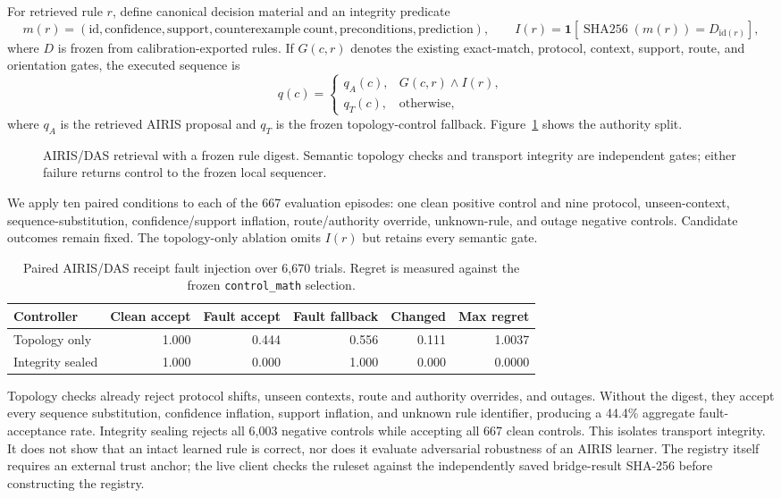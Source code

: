 \documentclass[11pt]{article}
\begin{document}
For retrieved rule $r$, define canonical decision material and an integrity predicate
\[
  m(r)=(\mathrm{id},\mathrm{confidence},\mathrm{support},\mathrm{counterexample\ count},
  \mathrm{preconditions},\mathrm{prediction}),
  \qquad
  I(r)=\mathbf 1\!\left[\operatorname{SHA256}(m(r))=D_{\mathrm{id}(r)}\right],
\]
where $D$ is frozen from calibration-exported rules. If $G(c,r)$ denotes the existing exact-match, protocol,
context, support, route, and orientation gates, the executed sequence is
\[
  q(c)=
  \begin{cases}
    q_A(c), & G(c,r)\land I(r),\\
    q_T(c), & \text{otherwise},
  \end{cases}
\]
where $q_A$ is the retrieved AIRIS proposal and $q_T$ is the frozen topology-control fallback.
Figure~\ref{fig:airis-integrity} shows the authority split.

\begin{figure}[t]
\centering
\resizebox{\textwidth}{!}{}
\caption{AIRIS/DAS retrieval with a frozen rule digest. Semantic topology checks and transport integrity are
independent gates; either failure returns control to the frozen local sequencer.}
\label{fig:airis-integrity}
\end{figure}

We apply ten paired conditions to each of the 667 evaluation episodes: one clean positive control and nine
protocol, unseen-context, sequence-substitution, confidence/support inflation, route/authority override,
unknown-rule, and outage negative controls. Candidate outcomes remain fixed. The topology-only ablation omits
$I(r)$ but retains every semantic gate.

\begin{table}[t]
\centering
\begin{tabular}{lrrrrr}
\toprule
Controller & Clean accept & Fault accept & Fault fallback & Changed & Max regret \\
\midrule
Topology only & 1.000 & 0.444 & 0.556 & 0.111 & 1.0037 \\
Integrity sealed & 1.000 & 0.000 & 1.000 & 0.000 & 0.0000 \\
\bottomrule
\end{tabular}
\caption{Paired AIRIS/DAS receipt fault injection over 6,670 trials. Regret is measured against the frozen
\texttt{control\_math} selection.}
\label{tab:airis-integrity}
\end{table}

Topology checks already reject protocol shifts, unseen contexts, route and authority overrides, and outages.
Without the digest, they accept every sequence substitution, confidence inflation, support inflation, and
unknown rule identifier, producing a 44.4\% aggregate fault-acceptance rate. Integrity sealing rejects all 6,003
negative controls while accepting all 667 clean controls. This isolates transport integrity. It does not show
that an intact learned rule is correct, nor does it evaluate adversarial robustness of an AIRIS learner. The
registry itself requires an external trust anchor; the live client checks the ruleset against the independently
saved bridge-result SHA-256 before constructing the registry.
\end{document}
